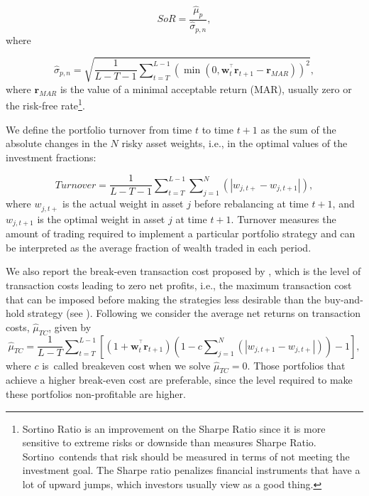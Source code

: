 \documentclass[a4paper,10pt]{article}
\begin{document}
\begin{equation}
SoR=\frac{\widehat{\mu }_{p}}{\widehat{\sigma }_{p,n}},
\end{equation}%
where

\begin{equation}
\widehat{\sigma }_{p,n}=\sqrt{\frac{1}{L-T-1}\sum\nolimits_{t=T}^{L-1}\left(
	\min \left( 0,\mathbf{w}_{t}^{^{\top }}\mathbf{r}_{t+1}-\mathbf{r}%
	_{MAR}\right) \right) ^{2}},
\end{equation}%
where $\mathbf{r}_{MAR}$ is the value of a minimal acceptable return (MAR),
usually zero or the risk-free rate\footnote{%
	Sortino Ratio is an improvement on the Sharpe Ratio since it is more
	sensitive to extreme risks or downside than measures Sharpe Ratio. Sortino{\
	}contends that risk should be measured in terms of not meeting the
	investment goal. The Sharpe ratio penalizes financial instruments that have
	a lot of upward jumps, which investors usually view as a good thing.}.

\bigskip

We define the portfolio turnover from time $t$ to time $t+1$ as the sum of
the absolute changes in the $N$ risky asset weights, i.e., in the optimal
values of the investment fractions:

\begin{equation}
Turnover=\frac{1}{L-T-1}\sum\nolimits_{t=T}^{L-1}\sum\nolimits_{j=1}^{N}%
\left( \left\vert w_{j,t+}-w_{j,t+1}\right\vert \right) ,
\end{equation}%
where $w_{j,t+}^{{}}$ is the actual weight in asset $j$ before rebalancing
at time $t+1$, and $w_{j,t+1}$ is the optimal weight in asset $j$ at time $%
t+1$. Turnover measures the amount of trading required to implement a
particular portfolio strategy and can be interpreted as the average fraction
of wealth traded in each period. 

\bigskip

We also report the break-even transaction cost proposed by \citet*{bessembinder1995}, which is the level of transaction costs leading to zero
net profits, i.e., the maximum transaction cost that can be imposed before
making the strategies less desirable than the buy-and-hold strategy (see %
\citet*{han2006}). Following \citet*{santos2012} we consider the average net
returns on transaction costs, $\widehat{\mu }_{TC}$, given by
\begin{equation}
\widehat{\mu }_{TC}=\frac{1}{L-T}\sum\nolimits_{t=T}^{L-1}\left[ \left( 1+%
\mathbf{w}_{t}^{^{\top }}\mathbf{r}_{t+1}\right) \left(
1-c\sum\nolimits_{j=1}^{N}\left( \left\vert w_{j,t+1}-w_{j,t+}\right\vert
\right) \right) -1\right] ,
\end{equation}%
where $c$ is\ called breakeven cost when we solve $\widehat{\mu }_{TC}=0.$ Those portfolios that achieve a higher break-even cost are preferable, since the level required to make these portfolios non-profitable are higher.
\end{document}
